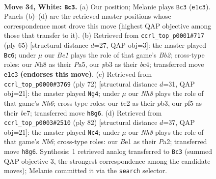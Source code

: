 \documentclass[11pt]{article}
\begin{document}
\clearpage

\begin{figure}[p]\centering
\begin{subfigure}{0.46\textwidth}\centering
\resizebox{\linewidth}{!}{%
\newchessgame
\chessboard[
  setfen={6kN/8/8/3p1p2/2pn1P2/1p6/1P2b3/1K2B2B w - - 4 34},
  showmover=false,
  pgfstyle=straightmove, color=movearrow, markmove={e1-c3}
]}
\caption{}
\end{subfigure}\hfill
\begin{subfigure}{0.46\textwidth}\centering
\resizebox{\linewidth}{!}{%
\newchessgame
\chessboard[
  setfen={5k2/1b3p2/1P5p/p7/N1Bb3P/P7/1P6/2K5 b - - 0 33},
  showmover=false,
  pgfstyle=straightmove, color=movearrow, markmove={b7-c6}
]}
\caption{}
\end{subfigure}
\\[4pt]
\begin{subfigure}{0.46\textwidth}\centering
\resizebox{\linewidth}{!}{%
\newchessgame
\chessboard[
  setfen={8/4b3/6kN/3K2p1/7p/1p5P/1P1B2P1/n7 w - - 2 37},
  showmover=false,
  pgfstyle=straightmove, color=movearrow, markmove={h6-g4}
]}
\caption{}
\end{subfigure}\hfill
\begin{subfigure}{0.46\textwidth}\centering
\resizebox{\linewidth}{!}{%
\newchessgame
\chessboard[
  setfen={8/8/1Nk1n1p1/B1p1pp2/3b4/1P3PP1/P3K3/8 w - - 7 42},
  showmover=false,
  pgfstyle=straightmove, color=movearrow, markmove={b6-c4}
]}
\caption{}
\end{subfigure}
\caption{\textbf{Move 34, White: \texttt{Bc3}.} (a) Our position; Melanie plays \texttt{Bc3} (\texttt{e1c3}). Panels (b)--(d) are the retrieved master positions whose correspondence most drove this move (highest QAP objective among those that transfer to it). (b) Retrieved from \texttt{ccrl\_top\_p0001\#717} (ply 65) [structural distance $d$=27, QAP obj=3]: the master played \texttt{Bc6}; under $\mu$ our \emph{Be1} plays the role of that game's \emph{Bb2}; cross-type roles: our \emph{N}h8 as their \emph{P}a5, our \emph{p}b3 as their \emph{b}c4; transferred move \texttt{e1c3} \textbf{(endorses this move)}. (c) Retrieved from \texttt{ccrl\_top\_p0000\#3769} (ply 72) [structural distance $d$=31, QAP obj=21]: the master played \texttt{Ng4}; under $\mu$ our \emph{Nh8} plays the role of that game's \emph{Nh6}; cross-type roles: our \emph{b}e2 as their \emph{p}b3, our \emph{p}f5 as their \emph{b}e7; transferred move \texttt{h8g6}. (d) Retrieved from \texttt{ccrl\_top\_p0003\#2510} (ply 82) [structural distance $d$=37, QAP obj=21]: the master played \texttt{Nc4}; under $\mu$ our \emph{Nh8} plays the role of that game's \emph{Nb6}; cross-type roles: our \emph{B}e1 as their \emph{P}a2; transferred move \texttt{h8g6}. Synthesis: 1 retrieved analog transferred to \texttt{Bc3} (summed QAP objective 3, the strongest correspondence among the candidate moves); Melanie committed it via the \texttt{search} selector.}
\label{fig:thought-m66}
\end{figure}
\end{document}
